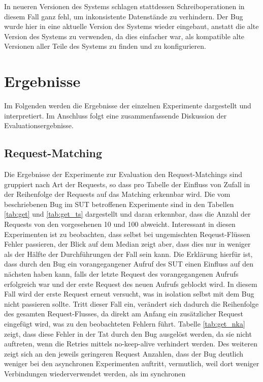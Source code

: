 \documentclass[12pt,a4paper]{report}
\begin{document}
In neueren Versionen des Systems schlagen stattdessen Schreiboperationen in diesem Fall ganz fehl, um inkonsistente Datenstände zu
verhindern. Der Bug wurde hier in eine aktuelle Version des Systems wieder eingebaut, anstatt die alte Version des Systems zu
verwenden, da dies einfacher war, als kompatible alte Versionen aller Teile des Systems zu finden und zu konfigurieren.

\chapter{Ergebnisse}
\label{chap:results}
Im Folgenden werden die Ergebnisse der einzelnen Experimente dargestellt und interpretiert. Im Anschluss folgt eine
zusammenfassende Diskussion der Evaluationsergebnisse.

\section{Request-Matching}
Die Ergebnisse der Experimente zur Evaluation den Request-Matchings sind gruppiert nach Art der Requests, so dass pro Tabelle
der Einfluss von Zufall in der Reihenfolge der Requests auf das Matching erkennbar wird. Die vom beschriebenen Bug im SUT
betroffenen Experimente sind in den Tabellen \ref{tab:get} und \ref{tab:get_ts} dargestellt und daran erkennbar, dass die Anzahl
der Requests von den vorgesehenen 10 und 100 abweicht. Interessant in diesen Experimenten ist zu beobachten, dass selbst bei
ungemischten Reqeust-Flüssen Fehler passieren, der Blick auf dem Median zeigt aber, dass dies nur in weniger als der Hälfte der
Durchführungen der Fall sein kann. Die Erklärung hierfür ist, dass durch den Bug ein vorangegangener Aufruf des SUT einen
Einfluss auf den nächsten haben kann, falls der letzte Request des vorangegangenen Aufrufs erfolgreich war und der erste Request
des neuen Aufrufs geblockt wird. In diesem Fall wird der erste Request erneut versucht, was in isolation selbst mit dem Bug
nicht passieren sollte. Tritt dieser Fall ein, verändert sich dadurch die Reihenfolge des gesamten Request-Flusses, da direkt am
Anfang ein zusätzlicher Request eingefügt wird, was zu den beobachteten Fehlern führt. Tabelle \ref{tab:get_nka} zeigt, dass
diese Fehler in der Tat durch den Bug ausgelöst werden, da sie nicht auftreten, wenn die Retries mittels no-keep-alive
verhindert werden. Des weiteren zeigt sich an den jeweils geringeren Request Anzahlen, dass der Bug deutlich weniger bei den
asynchronen Experimenten auftritt, vermutlich, weil dort weniger Verbindungen wiederverwendet werden, als im synchronen
\end{document}
